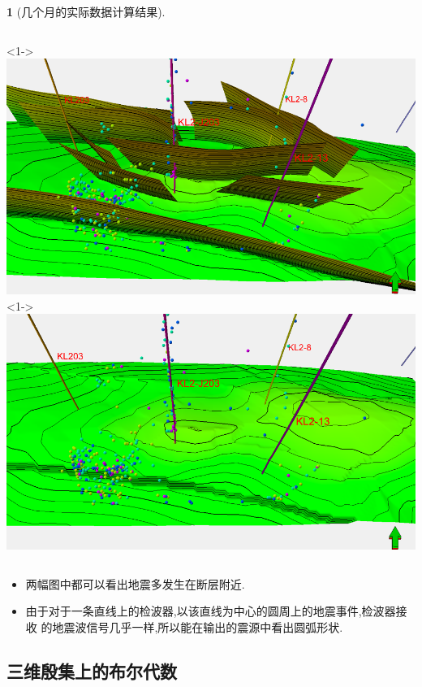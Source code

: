 \documentclass[UTF8]{ctexbeamer}	%
\theoremstyle{plain}
\theoremstyle{definition}
\newtheorem{emt}{}[section]
\theoremstyle{remark}
\numberwithin{equation}{section}
\begin{document}
\begin{frame}
\begin{emt}[几个月的实际数据计算结果]
    \begin{columns}
        <1->
        \includegraphics[width = \textwidth]{fig/s2p5.png}
        <1->
        \includegraphics[width = \textwidth]{fig/s2p6.png}
    \end{columns}

    \begin{itemize}
        \item 两幅图中都可以看出地震多发生在断层附近.
        \item 由于对于一条直线上的检波器,以该直线为中心的圆周上的地震事件,检波器接收
        的地震波信号几乎一样,所以能在输出的震源中看出圆弧形状.
    \end{itemize}
\end{emt}
\end{frame}

\subsection{三维殷集上的布尔代数}
\end{document}
